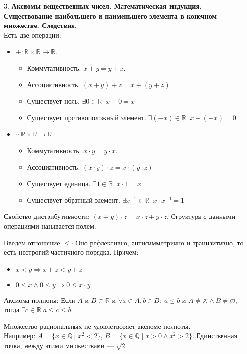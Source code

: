 \documentclass[12pt]{article}
\begin{document}
3. \textbf{Аксиомы вещественных чисел. Математическая индукция. Существование наибольшего и наименьшего элемента в конечном множестве. Следствия.}\\
Есть две операции:
\begin{itemize}
    \item $+: \mathbb{R} \times \mathbb{R} \to \mathbb{R}$.
        \begin{itemize}
            \item Коммутативность. $x+y=y+x$.
            \item Ассоциативность.  $(x+y)+z=x+(y+z)$
            \item Существует ноль.  $\exists 0 \in \mathbb{R} \; \; x + 0 = x$
            \item Существует противоположный элемент. $\exists (-x) \in \mathbb{R} \; \; x+(-x) = 0$
        \end{itemize}
    \item $\cdot: \mathbb{R} \times \mathbb{R} \to \mathbb{R}$.
        \begin{itemize}
            \item Коммутативность. $x\cdot y=y\cdot x$.
            \item Ассоциативность.  $(x\cdot y)\cdot z=x\cdot (y\cdot z)$
            \item Существует единица.  $\exists 1 \in \mathbb{R} \; \; x \cdot 1 = x$
            \item Существует обратный элемент. $\exists x^{-1} \in \mathbb{R} \; \; x \cdot x^{-1} = 1$
        \end{itemize}
\end{itemize}
Свойство дистрибутивности: $(x+y) \cdot z = x \cdot z + y \cdot z$. Структура с данными операциями называется полем.

Введем отношение $\le$: Оно рефлексивно, антисимметрично и транизитивно, то есть нестрогий частичного порядка. Причем:
\begin{itemize}
    \item $x< y \Rightarrow x+z < y+z$
    \item  $0 \le x \land 0 \le y \Rightarrow 0 \le x\cdot y$
\end{itemize}
Аксиома полноты: Если $A$ и $B \subset \mathbb{R}$ и $\forall a \in A, b \in B: \; a \le b$ и $A \neq \varnothing \land B \neq \varnothing$, тогда $\exists c \in \mathbb{R}\; a \le c \le b$.
\begin{remark}
    Множество рациональных не удовлетворяет аксиоме полноты.\\
    Например: $A = \{x \in \mathbb{Q} \; \vert \; x^2 < 2\}$,  $B = \{x \in \mathbb{Q} \; \vert \; x>0 \land x^2 > 2\}$. Единственная точка, между этими множествами --- $\sqrt{2}$ 
\end{remark}
\end{document}
